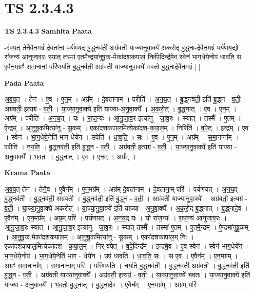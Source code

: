 \documentclass[17pt]{extarticle}
\begin{document}
\section{ TS 2.3.4.3 }

\textbf{TS 2.3.4.3 } \newline
\textbf{Samhita Paata} \newline

-र॑वप॒त् तेनै॒वैन॒मग्रं॑ दे॒वता॑नां॒ पर्य॑णयद् बु॒द्ध्नव॑ती॒ अग्र॑वती याज्यानुवा॒क्ये॑ अकरोद् बु॒द्ध्ना-दे॒वैन॒मग्रं॒ पर्य॑णय॒द्यो रा॑ज॒न्य॑ आनुजाव॒रः स्यात् तस्मा॑ ए॒तमै॒न्द्रमा॑नुषू॒क-मेका॑दशकपालं॒ निर्व॑पे॒दिन्द्र॑मे॒व स्वेन॑ भाग॒धेये॒नोप॑ धावति॒ स ए॒वैन॒मग्रꣳ॑ समा॒नानां॒ परि॑णयति बु॒द्ध्नव॑ती॒ अग्र॑वती याज्यानुवा॒क्ये॑ भवतो बु॒द्ध्नादे॒वैन॒मग्रं॒ [  ] \newline

\textbf{Pada Paata} \newline

अ॒व॒प॒त् । तेन॑ । ए॒व । ए॒न॒म् । अग्र᳚म् । दे॒वता॑नाम् । परीति॑ । अ॒न॒य॒त् । बु॒द्ध्नव॑ती॒ इति॑ बु॒द्ध्न - व॒ती॒ । अग्र॑वती॒ इत्यग्र॑ - व॒ती॒ । या॒ज्या॒नु॒वा॒क्ये॑ इति॑ याज्या-अ॒नु॒वा॒क्ये᳚ । अ॒क॒रो॒त् । बु॒द्ध्नात् । ए॒व । ए॒न॒म् । अग्र᳚म् । परीति॑ । अ॒न॒य॒त् । यः । रा॒ज॒न्यः॑ । आ॒नु॒जा॒व॒र इत्या॑नु - जा॒व॒रः । स्यात् । तस्मै᳚ । ए॒तम् । ऐ॒न्द्रम् । आ॒नु॒षू॒कमित्या॑नु - सू॒कम् । एका॑दशकपाल॒मित्येका॑दश-क॒पा॒ल॒म् । निरिति॑ । व॒पे॒त् । इन्द्र᳚म् । ए॒व । स्वेन॑ । भा॒ग॒धेये॒नेति॑ भाग-धेये॑न । उपेति॑ । धा॒व॒ति॒ । सः । ए॒व । ए॒न॒म् । अग्र᳚म् । स॒मा॒नाना᳚म् । परीति॑ । न॒य॒ति॒ । बु॒द्ध्नव॑ती॒ इति॑ बु॒द्ध्न - व॒ती॒ । अग्र॑वती॒ इत्यग्र॑ - व॒ती॒ । या॒ज्या॒नु॒वा॒क्ये॑ इति॑ याज्या - अ॒नु॒वा॒क्ये᳚ । भ॒व॒तः॒ । बु॒द्ध्नात् । ए॒व । ए॒न॒म् । अग्र᳚म् ।  \newline


\textbf{Krama Paata} \newline

अ॒व॒प॒त् तेन॑ । तेनै॒व । ए॒वैन᳚म् । ए॒न॒मग्र᳚म् । अग्र॑म् दे॒वता॑नाम् । दे॒वता॑ना॒म् परि॑ । पर्य॑णयत् । अ॒न॒य॒द् बु॒द्ध्नव॑ती । बु॒द्ध्नव॑ती॒ अग्र॑वती । बु॒द्ध्नव॑ती॒ इति॑ बु॒द्ध्न - व॒ती॒ । अग्र॑वती याज्यानुवा॒क्ये᳚ । अग्र॑वती॒ इत्यग्र॑ - व॒ती॒ । या॒ज्या॒नु॒वा॒क्ये॑ अकरोत् । या॒ज्या॒नु॒वा॒क्ये॑ इति॑ याज्या - अ॒नु॒वा॒क्ये᳚ । अ॒क॒रो॒द् बु॒द्ध्नात् । बु॒द्ध्नादे॒व । ए॒वैन᳚म् । ए॒न॒मग्र᳚म् । अग्र॒म् परि॑ । पर्य॑णयत् । अ॒न॒य॒द् यः । यो रा॑ज॒न्यः॑ । रा॒ज॒न्य॑ आनुजाव॒रः । आ॒नु॒जा॒व॒रः स्यात् । आ॒नु॒जा॒व॒र इत्या॑नु - जा॒व॒रः । स्यात् तस्मै᳚ । तस्मा॑ ए॒तम् । ए॒तमै॒न्द्रम् । ऐ॒न्द्रमा॑नुषू॒कम् । आ॒नु॒षू॒क,मेका॑दशकपालम् । आ॒नु॒षू॒कमित्या॑नु - सू॒कम् । एका॑दशकापाल॒म् निः । एका॑दशकपाल॒मित्येका॑दश - क॒पा॒ल॒म् । निर् व॑पेत् । व॒पे॒दिन्द्र᳚म् । इन्द्र॑मे॒व । ए॒व स्वेन॑ । स्वेन॑ भाग॒धेये॑न । भा॒ग॒धेये॒नोप॑ । भा॒ग॒धेये॒नेति॑ भाग - धेये॑न । उप॑ धावति । धा॒व॒ति॒ सः । स ए॒व । ए॒वैन᳚म् । ए॒न॒मग्र᳚म् । अग्रꣳ॑ समा॒नाना᳚म् । स॒मा॒नाना॒म् परि॑ । परि॑णयति । न॒य॒ति॒ बु॒द्ध्नव॑ती । बु॒द्ध्नव॑ती॒ अग्र॑वती । बु॒द्ध्नव॑ती॒ इति॑ बु॒द्ध्न - व॒ती॒ । अग्र॑वती याज्यानुवा॒क्ये᳚ । अग्र॑वती॒ इत्यग्र॑ - व॒ती॒ । या॒ज्या॒नु॒वा॒क्ये॑ भवतः । या॒ज्या॒नु॒वा॒क्ये॑ इति॑ याज्या - अ॒नु॒वा॒क्ये᳚ । भ॒व॒तो॒ बु॒द्ध्नात् । बु॒द्ध्नादे॒व । ए॒वैन᳚म् । ए॒न॒मग्र᳚म् । अग्र॒म् परि॑ \newline
\end{document}
